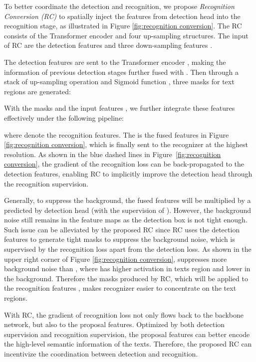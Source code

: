 \documentclass[10pt,twocolumn,letterpaper]{article}
\begin{document}
To better coordinate the detection and recognition, we propose \textit{Recognition Conversion (RC)} to spatially inject the features from detection head into the recognition stage, as illustrated in Figure \ref{fig:recognition conversion}. 
The RC consists of the Transformer encoder \cite{vaswani2017attention} and four up-sampling structures. The input of RC are the detection features  and three down-sampling features .


The detection features are sent to the Transformer encoder , making the information of previous detection stages further fused with . 
Then through a stack of up-sampling operation  and Sigmoid function , three masks  for text regions are generated:



With the masks  and the input features , we further integrate these features effectively under the following pipeline:


where  denote the recognition features. The  is the fused features in Figure \ref{fig:recognition conversion}, which is finally sent to the recognizer at the highest resolution. 
As shown in the blue dashed lines in Figure~\ref{fig:recognition conversion},
the gradient of the recognition loss  can be back-propagated to the detection features, enabling RC to implicitly improve the detection head through the recognition supervision.


Generally, to suppress the background, the fused features will be multiplied by a  predicted by detection head (with the supervision of ).
However, the background noise still remains in the feature maps as the detection box is not tight enough.
Such issue can be alleviated by the proposed RC since RC uses the detection features to generate tight masks to suppress the background noise, which is supervised by the recognition loss apart from the detection loss. 
As shown in the upper right corner of Figure \ref{fig:recognition conversion},  suppresses more background noise than , where  has higher activation in texts region and lower in the background.
Therefore the masks  produced by RC, which will be applied to the recognition features , makes recognizer easier to concentrate on the text regions. 




With RC, the gradient of recognition loss not only flows back to the backbone network, but also to the proposal features. 
Optimized by both detection supervision and recognition supervision, the proposal features can better encode the high-level semantic information of the texts.
Therefore, the proposed RC can incentivize the coordination between detection and recognition. 
\end{document}
